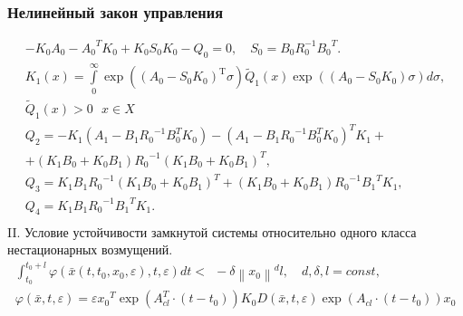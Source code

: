 \documentclass[default]{beamer}
\begin{document}
	\begin{frame}
		\frametitle{Нелинейный закон управления}
		\begingroup
		\fontsize{9pt}{9pt}\selectfont
			\[\begin{matrix}
			-{{K}_{0}}{{A}_{0}}-{{A}_{0}}^{T}{{K}_{0}}+{{K}_{0}}{{S}_{0}}{{K}_{0}}-{{Q}_{0}}=0,\quad {{S}_{0}}={{B}_{0}}R_{0}^{-1}{{B}_{0}}^{T}.\\
			{{K}_{1}}(x)=\int\limits_{0}^{\infty }{\exp (({{A}_{0}}-{{S}_{0}}{{K}_{0}})_{{}}^{\text{T}}\sigma )}{{{\tilde{Q}}}_{1}}(x)\exp (({{A}_{0}}-{{S}_{0}}{{K}_{0}})\sigma )d\sigma ,\\ {{{\tilde{Q}}}_{1}}(x)>0\text{  }x\in X \\ 
			
			{{Q}_{2}}=-{{K}_{1}}\left( {{A}_{1}}-{{B}_{1}}{{R}_{0}}^{-1}B_{0}^{T}{{K}_{0}} \right)-{{\left( {{A}_{1}}-{{B}_{1}}{{R}_{0}}^{-1}B_{0}^{T}{{K}_{0}} \right)}^{T}}{{K}_{1}}+\\
			
			+\left( {{K}_{1}}{{B}_{0}}+{{K}_{0}}{{B}_{1}} \right){{R}_{0}}^{-1}{{\left( {{K}_{1}}{{B}_{0}}+{{K}_{0}}{{B}_{1}} \right)}^{T}}, \\ 
			
			{{Q}_{3}}={{K}_{1}}{{B}_{1}}{{R}_{0}}^{-1}{{\left( {{K}_{1}}{{B}_{0}}+{{K}_{0}}{{B}_{1}} \right)}^{T}}+\left( {{K}_{1}}{{B}_{0}}+{{K}_{0}}{{B}_{1}} \right){{R}_{0}}^{-1}{{B}_{1}}^{T}{{K}_{1}}, \\ 
			{{Q}_{4}}={{K}_{1}}{{B}_{1}}{{R}_{0}}^{-1}{{B}_{1}}^{T}{{K}_{1}}. \\ 
			\end{matrix}\]
		\endgroup
		II. Условие устойчивости замкнутой системы относительно одного класса нестационарных возмущений. 
		\begingroup
		\fontsize{9pt}{9pt}\selectfont
			\[\begin{matrix}
			\int_{{{t}_{0}}}^{{{t}_{0}}+l}{\varphi (\bar{x}(t,{{t}_{0}},{{x}_{0}},\varepsilon ),t,\varepsilon )}dt<\ \ -\delta {{\left\| {{x}_{0}} \right\|}^{d}}l,\quad d,\delta ,l=const, \\ 
			\varphi (\bar{x},t,\varepsilon )=\varepsilon {{x}_{0}}^{T}\exp (A_{cl}^{T}\cdot (t-{{t}_{0}})){{K}_{0}}D(\bar{x},t,\varepsilon )\exp ({{A}_{cl}}\cdot (t-{{t}_{0}})){{x}_{0}} \\ 
			\end{matrix}\]
		\endgroup
	\end{frame}
	
\end{document}
